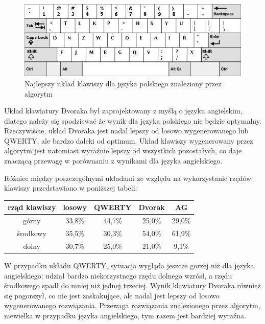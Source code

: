 \documentclass[brudnopis]{xmgr}
\begin{document}
\begin{figure}[!tbh]
\centering
\includegraphics[width=.8\hsize]{fig/best_pl}
\caption{Najlepszy układ klawiszy dla języka polskiego znaleziony przez algorytm}
\end{figure}

Układ klawiatury Dvoraka był zaprojektowany z myślą o języku angielskim, dlatego należy się spodziewać że wynik dla języka polskiego nie będzie optymalny. Rzeczywiście, układ Dvoraka jest nadal lepszy od losowo wygenerowanego lub QWERTY, ale bardzo daleki od optimum. Układ klawiszy wygenerowany przez algorytm jest natomiast wyraźnie lepszy od wszystkich pozostałych, co daje znaczącą przewagę w porównaniu z wynikami dla języka angielskiego.

Różnice między poszczególnymi układami ze względu na wykorzystanie rzędów klawiszy przedstawiono w poniższej tabeli:\newline\newline
\begin{tabular}{ c | c | c | c | c}
  rząd klawiszy   & losowy & QWERTY & Dvorak & AG \\
  \hline
  górny           & 33,8\% & 44,7\% & 25,0\% & 29,0\% \\
  środkowy        & 35,5\% & 30,3\% & 54,0\% & 61,9\% \\
  dolny           & 30,7\% & 25,0\% & 21,0\% &  9,1\% \\
\end{tabular}\newline

W przypadku układu QWERTY, sytuacja wygląda jeszcze gorzej niż dla języka angielskiego: udział bardzo niekorzystnego rzędu dolnego wzrósł, a rzędu środkowego spadł do mniej niż jednej trzeciej. Wynik klawiatury Dvoraka również się pogorszył, co nie jest zaskakujące, ale nadal jest lepszy od losowo wygenerowanego rozwiązania. Przewaga rozwiązania znalezionego przez algorytm, niewielka w przypadku języka angielskiego, tym razem jest bardziej wyraźna.
\end{document}

